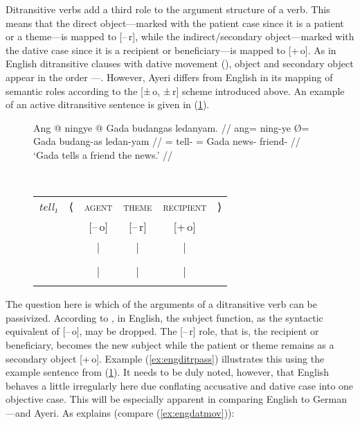 Ditransitive verbs add a third role to the argument structure of a verb. This
means that the direct object---marked with the patient case since it is a
patient or a theme---is mapped to [–\,r], while the indirect/secondary
object---marked with the dative case since it is a recipient or
beneficiary---is mapped to [+\,o]. As in English ditransitive clauses with
dative movement (), object and secondary object appear in
the order \Obj{}---\SObj{}. However, Ayeri differs from English in its mapping
of semantic roles according to the [±\,o, ±\,r] scheme introduced above. An
example of an active ditransitive sentence is given in (\ref{ex:ditrorder}).

\begin{figure}
\ex\label{ex:ditrorder}
\begin{minipage}[t]{.4\remaining}
\begingl
	\gla Ang @ ningye {} @ Gada budangas ledanyam. //
	\glb ang= ning-ye Ø= Gada budang-as ledan-yam //
	\glc \AgtT{}= tell-\TsgF{} \Top{}= Gada news-\Parg{} friend-\Dat{} //
	\glft `Gada tells a friend the news.' //
\endgl
\end{minipage}
~
\begin{tabular}[t]{>{\itshape}l l c c c r}
tell₁
	& ⟨
	& \textsc{agent}
	& \textsc{theme}
	& \textsc{recipient}
	& ⟩
	\\
%
	& %
	& [–\,o]
	& [–\,r]
	& [+\,o]
	& %
	\\

%
	& %
	& |
	& |
	& |
	& %
	\\

%
	& %
	& \Subj*
	& \Obj
	& \SObj
	& %
	\\

%
	& %
	& |
	& |
	& |
	& %
	\\

%
	& %
	& \fw{Gada}
	& \fw{news}
	& \fw{friend}
	& %
	\\
\end{tabular}
\xe
\end{figure}

The question here is which of the arguments of a ditransitive verb can be
passivized. According to \citet{bresnan2016}, in English, the subject function,
as the syntactic equivalent of [–\,o], may be dropped. The [–\,r] role, that
is, the recipient or beneficiary, becomes the new subject while the patient or
theme remains as a secondary object [+\,o]. Example (\ref{ex:engditrpass})
illustrates this using the example sentence from (\ref{ex:ditrorder}). It needs
to be duly noted, however, that English behaves a little irregularly here due
conflating accusative and dative case into one objective case. This will be
especially apparent in comparing English to German---and Ayeri. As
\citet{kibort2007} explains (compare (\ref{ex:engdatmov})):

